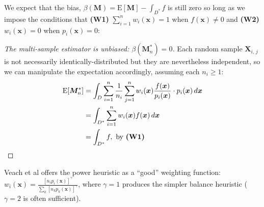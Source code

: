 \documentclass{article}
\newcommand{\E}{\mathrm{E}}
\begin{document}
    We expect that the bias, $\beta(\bm{M}) = \E[\bm{M}] - \int_{D^\ast}f$ is still zero 
    so long as we impose the conditions that 
    \textbf{(W1)} $\sum_{i=1}^{n}w_i(\bm{x}) = 1$ when $f(\bm{x})\neq0$ and 
    \textbf{(W2)} $w_i(\bm{x}) = 0$ when $p_i(\bm{x}) = 0$:
    \begin{proof}[The multi-sample estimator is unbiased: $\beta(\bm{M}_n^\ast) = 0$]
      Each random sample $\bm{X}_{i,\,j}$ is not necessarily 
      identically-distributed but they are nevertheless independent, 
      so we can manipulate the expectation accordingly,
      assuming each $n_i \geq 1$:
      \begin{align*}
        \E[\bm{M}_n^\ast] &= 
        \int_{D}\sum_{i=1}^{n} \frac{1}{n_i} 
        \sum_{j=1}^{n} w_i(\bm{x})\frac{f(\bm{x})}{p_i(\bm{x})}\cdot p_i(\bm{x})\,d\bm{x}\\
        &= \int_{D^\ast}\sum_{i=1}^{n} w_i(\bm{x})f(\bm{x})\,d\bm{x}\\
        &= \int_{D^\ast}f, \text{ by \textbf{(W1)}}
      \end{align*}
    \end{proof}
    Veach et al offers the power heuristic as a ``good'' 
    weighting function: $w_i(\bm{x}) = \frac{[n_ip_i(\bm{x})]^\gamma}{\sum_{k}[n_kp_k(\bm{x})]^\gamma}$,
    where $\gamma = 1$ produces the simpler balance heuristic ($\gamma = 2$ is 
    often sufficient).
\end{document}

